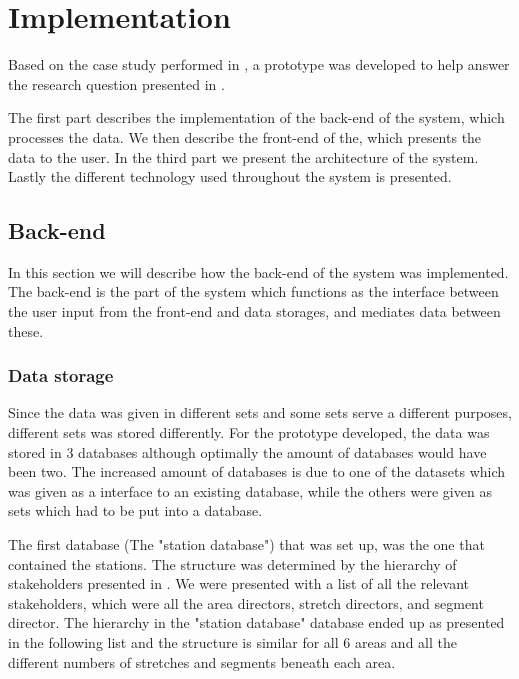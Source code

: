 
\chapter{Implementation} %
\label{cha:implementation}
Based on the case study performed in  , a
prototype was developed to help answer the research question presented in
 .

The first part describes the implementation of the back-end of the system, 
which processes the data. We then describe the front-end of the, which
presents the data to the user. In the third part we present the architecture of
the system. Lastly the different technology used throughout the system is
presented.

\section{Back-end} %
\label{sec:back_end}
In this section we will describe how the back-end of the system was 
implemented. The back-end is the part of the system which functions as the
interface between the user input from the front-end and data storages, and
mediates data between these.

\subsection{Data storage} %
\label{sub:back_end_data_storage}
Since the data was given in different sets and some sets serve a different
purposes, different sets was stored differently. For the prototype developed, 
the data was stored in 3 databases although optimally the amount of databases 
would have been two. The increased amount of databases is due to one of the datasets which was given as a interface to an existing database, while the others were given as sets which had to be put into a database.

The first database (The "station database") that was set up, was the one that 
contained the stations.
The structure was determined by the hierarchy of stakeholders presented in
.  We were presented with a list of all the
relevant stakeholders, which were all the area directors, stretch directors,
and segment director. The hierarchy in the "station database" database ended 
up as presented in the following list and the structure is similar for all 6 
areas and all the different numbers of stretches and segments beneath each 
area.

